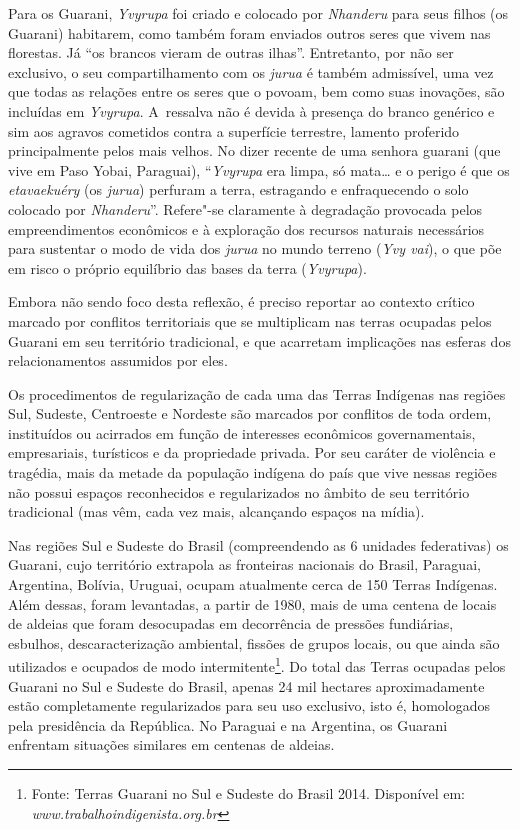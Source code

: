 Para os Guarani, \emph{Yvyrupa} foi criado e colocado por \emph{Nhanderu} para seus
filhos (os Guarani) habitarem, como também foram enviados outros seres
que vivem nas florestas. Já ``os brancos vieram de outras ilhas''.
Entretanto, por não ser exclusivo, o seu compartilhamento com os \emph{jurua}
é também admissível, uma vez que todas as relações entre os seres que o
povoam, bem como suas inovações, são incluídas em \emph{Yvyrupa}. A~ressalva
não é devida à presença do branco genérico e sim aos agravos cometidos
contra a superfície terrestre, lamento proferido principalmente pelos
mais velhos. No dizer recente de uma senhora guarani (que vive em Paso
Yobai, Paraguai), ``\emph{Yvyrupa} era limpa, só mata\ldots{} e o perigo é que os
\emph{etavaekuéry} (os \emph{jurua}) perfuram a terra, estragando e enfraquecendo o
solo colocado por \emph{Nhanderu}''. Refere"-se claramente à degradação
provocada pelos empreendimentos econômicos e à exploração dos recursos
naturais necessários para sustentar o modo de vida dos \emph{jurua} no mundo
terreno (\emph{Yvy vai}), o que põe em risco o próprio equilíbrio das bases da
terra (\emph{Yvyrupa}). 

Embora não sendo foco desta reflexão, é preciso reportar ao contexto
crítico marcado por conflitos territoriais que se multiplicam nas
terras ocupadas pelos Guarani em seu território tradicional, e que
acarretam implicações nas esferas dos relacionamentos assumidos por
eles. 

Os procedimentos de regularização de cada uma das Terras Indígenas nas
regiões Sul, Sudeste, Centroeste e Nordeste são marcados por conflitos
de toda ordem, instituídos ou acirrados em função de interesses
econômicos governamentais, empresariais, turísticos e da propriedade
privada. Por seu caráter de violência e tragédia, mais da metade da
população indígena do país que vive nessas regiões não possui espaços
reconhecidos e regularizados no âmbito de seu território tradicional
(mas vêm, cada vez mais, alcançando espaços na mídia).

Nas regiões Sul e Sudeste do Brasil (compreendendo as 6 unidades
federativas) os Guarani, cujo território extrapola as fronteiras
nacionais do Brasil, Paraguai, Argentina, Bolívia, Uruguai, ocupam
atualmente cerca de 150 Terras Indígenas. Além dessas, foram
levantadas, a partir de 1980, mais de uma centena de locais de aldeias
que foram desocupadas em decorrência de pressões fundiárias, esbulhos,
descaracterização ambiental, fissões de grupos locais, ou que ainda são
utilizados e ocupados de modo intermitente\footnote{Fonte: Terras
Guarani no Sul e Sudeste do Brasil 2014. Disponível em:
\emph{www.trabalhoindigenista.org.br}}. Do total das
Terras ocupadas pelos Guarani no Sul e Sudeste do Brasil, apenas 24 mil
hectares aproximadamente estão completamente regularizados para seu uso
exclusivo, isto é, homologados pela presidência da República. No
Paraguai e na Argentina, os Guarani enfrentam situações similares em
centenas de aldeias. 

